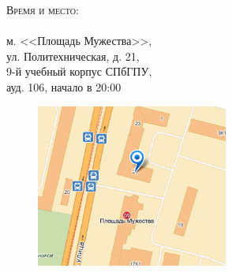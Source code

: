 \documentclass[12pt]{article}
\newcommand{\sectionline}[1]{%
  \nointerlineskip \vspace{.45\baselineskip}\hspace{\fill}
  {\resizebox{0.5\linewidth}{1.0ex}
    {\pgfornament{#1}
    }}%
    \hspace{\fill}
    \par\nointerlineskip \vspace{.45\baselineskip}
  }
\begin{document}
\sectionline{88}

\bigskip
\hfill
\begin{minipage}{0.41\textwidth}
\textsc{Время и место:}\\
\\
м. <<Площадь Мужества>>, \\ул. Политехническая, д. 21, \\9-й учебный корпус СПбГПУ,\\ ауд. 106, начало в 20:00
\end{minipage} 
\hfill
\begin{minipage}{0.4\textwidth}
\begin{figure}[H]
\includegraphics[width=6.3cm]{map.png} 
\end{figure}
\end{minipage}
\end{document}

